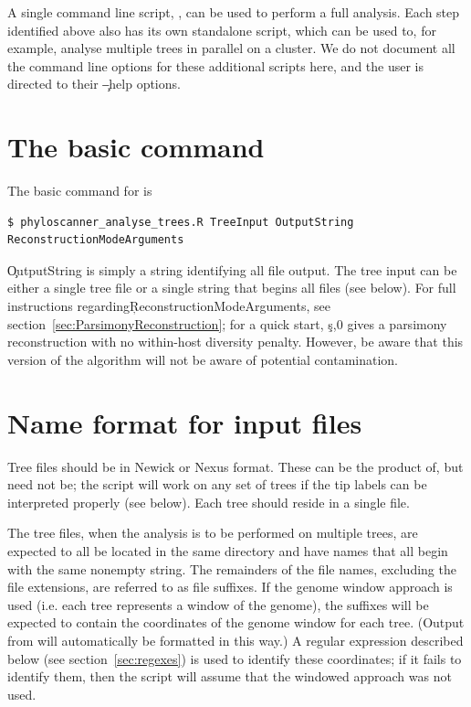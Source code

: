 A single command line script, \pat, can be used to perform a full analysis.
Each step identified above also has its own standalone script, which can be used to, for example, analyse multiple trees in parallel on a cluster.
We do not document all the command line options for these additional scripts here, and the user is directed to their \c{--help} options.

\section{The basic command}

The basic command for \pat is
\begin{verbatim}
$ phyloscanner_analyse_trees.R TreeInput OutputString ReconstructionModeArguments
\end{verbatim}
\c{OutputString} is simply a string identifying all file output.
The tree input can be either a single tree file or a single string that begins all files (see below).
For full instructions regarding\break \c{ReconstructionModeArguments}, see section~\ref{sec:ParsimonyReconstruction}; for a quick start, \c{s,0} gives a parsimony reconstruction with no within-host diversity penalty.
However, be aware that this version of the algorithm will not be aware of potential contamination.

\section{Name format for input files}

Tree files should be in Newick or Nexus format.
These can be the product of\break \pmt, but need not be; the script will work on any set of trees if the tip labels can be interpreted properly (see below).
Each tree should reside in a single file.

The tree files, when the analysis is to be performed on multiple trees, are expected to all be located in the same directory and have names that all begin with the same nonempty string.
The remainders of the file names, excluding the file extensions, are referred to as file suffixes.
If the genome window approach is used (i.e. each tree represents a window of the genome), the suffixes will be expected to contain the coordinates of the genome window for each tree.
(Output from \pmt will automatically be formatted in this way.) A regular expression described below (see section~\ref{sec:regexes}) is used to identify these coordinates; if it fails to identify them, then the script will assume that the windowed approach was not used.

